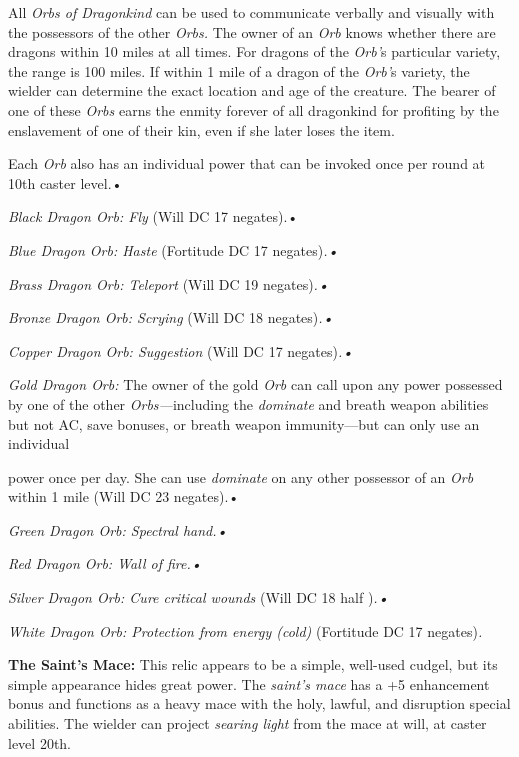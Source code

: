 All \textit{Orbs of Dragonkind }can be used to communicate verbally and visually 
with the possessors of the other \textit{Orbs. }The owner of an \textit{Orb }knows 
whether there are dragons within 10 miles at all times. For dragons of the \textit{Orb'}s 
particular variety, the range is 100 miles. If within 1 mile of a dragon of the 
\textit{Orb'}s variety, the wielder can determine the exact location and age of 
the creature. The bearer of one of these \textit{Orbs }earns the enmity forever 
of all dragonkind for profiting by the enslavement of one of their kin, even if 
she later loses the item. 

Each \textit{Orb }also has an individual power that can be invoked once per round 
at 10th caster level.•

\textit{Black Dragon Orb: Fly }(Will DC 17 negates).•

\textit{Blue Dragon Orb: Haste }(Fortitude DC 17 negates)\textit{.•}

\textit{Brass Dragon Orb: Teleport }(Will DC 19 negates)\textit{.•}

\textit{Bronze Dragon Orb: Scrying }(Will DC 18 negates)\textit{.•}

\textit{Copper Dragon Orb: Suggestion }(Will DC 17 negates)\textit{.•}

\textit{Gold Dragon Orb: }The owner of the gold \textit{Orb }can call upon any 
power possessed by one of the other \textit{Orbs---}including the \textit{dominate 
}and breath weapon abilities but not AC, save bonuses, or breath weapon immunity---but 
can only use an individual

power once per day. She can use \textit{dominate }on any other possessor of an 
\textit{Orb }within 1 mile (Will DC 23 negates).•

\textit{Green Dragon Orb: Spectral hand.•}

\textit{Red Dragon Orb: Wall of fire.•}

\textit{Silver Dragon Orb: Cure critical wounds }(Will DC 18 half )\textit{.•}

\textit{White Dragon Orb: Protection from energy (cold) }(Fortitude DC 17 negates)\textit{.}

\vspace{12pt}
\textbf{The Saint's Mace: }This relic appears to be a simple, well-used cudgel, 
but its simple appearance hides great power. The \textit{saint's mace }has a +5 
enhancement bonus and functions as a heavy mace with the holy, lawful, and disruption 
special abilities. The wielder can project \textit{searing light }from the mace 
at will, at caster level 20th.

